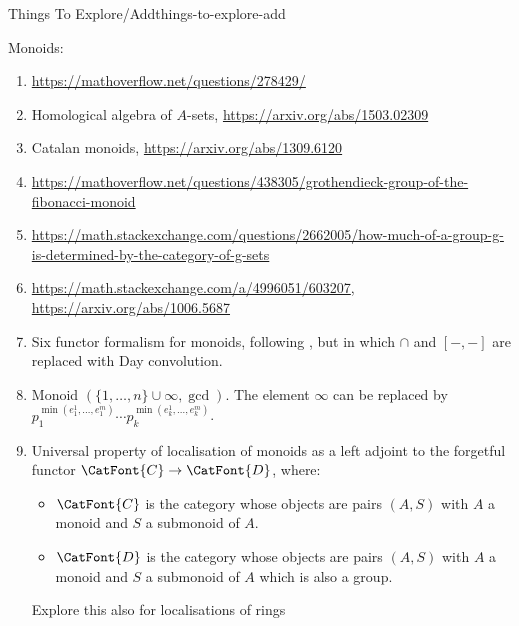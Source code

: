 \begin{remark}{Things To Explore/Add}{things-to-explore-add}
\begin{enumerate}
    \end{enumerate}
    Monoids:
    \begin{enumerate}
        \item \url{https://mathoverflow.net/questions/278429/}
        \item Homological algebra of $A$-sets, \url{https://arxiv.org/abs/1503.02309}
        \item Catalan monoids, \url{https://arxiv.org/abs/1309.6120}
        \item \url{https://mathoverflow.net/questions/438305/grothendieck-group-of-the-fibonacci-monoid}
        \item \url{https://math.stackexchange.com/questions/2662005/how-much-of-a-group-g-is-determined-by-the-category-of-g-sets}
        \item \url{https://math.stackexchange.com/a/4996051/603207}, \url{https://arxiv.org/abs/1006.5687}
        \item Six functor formalism for monoids, following , but in which $\cap$ and $[-,-]$ are replaced with Day convolution.
        \item Monoid $(\{1,\ldots,n\}\cup\infty,\gcd)$. The element $\infty$ can be replaced by $p^{\min(e^{1}_{1},\ldots,e^{m}_{1})}_{1}\cdots p^{\min(e^{1}_{k},\ldots,e^{m}_{k})}_{k}$.
        \item Universal property of localisation of monoids as a left adjoint to the forgetful functor $\CatFont{C}\to\CatFont{D}$, where:
            \begin{itemize}
                \item $\CatFont{C}$ is the category whose objects are pairs $(A,S)$ with $A$ a monoid and $S$ a submonoid of $A$.
                \item $\CatFont{D}$ is the category whose objects are pairs $(A,S)$ with $A$ a monoid and $S$ a submonoid of $A$ which is also a group.
            \end{itemize}
            Explore this also for localisations of rings


\end{enumerate}
\end{remark}
